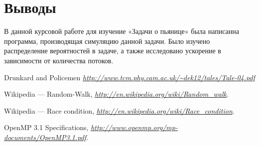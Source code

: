 \documentclass{article}
\begin{document}
    \pagebreak

    \section{Выводы}
    В данной курсовой работе для изучение «Задачи о пьянице» была написанна программа, производящая симуляцию данной задачи. Было изучено распределение вероятностей в задаче, а также исследовано ускорение в зависимости от количества потоков.
    \pagebreak

    \begin{thebibliography}{9}
        Drunkard and Policemen
        \emph{\url{http://www.tcm.phy.cam.ac.uk/~dek12/tales/Tale-04.pdf}}

      Wikipedia — Random-Walk,
      \emph{\url{http://en.wikipedia.org/wiki/Random_walk}}.

      Wikipedia — Race condition,
      \emph{\url{http://en.wikipedia.org/wiki/Race_condition}}.

      OpenMP 3.1 Specifications,
      \emph{\url{http://www.openmp.org/mp-documents/OpenMP3.1.pdf}}.
      
    \end{thebibliography}
\end{document}

